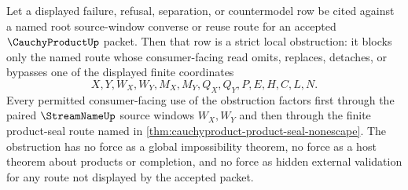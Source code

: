 \begin{corollary}
\label{cor:cauchyproduct-root-source-window-strict-obstruction}
Let a displayed failure, refusal, separation, or countermodel row be cited against a named root source-window converse or reuse route for an accepted $\CauchyProductUp$ packet. Then that row is a strict local obstruction: it blocks only the named route whose consumer-facing read omits, replaces, detaches, or bypasses one of the displayed finite coordinates
$$
X,Y,W_X,W_Y,M_X,M_Y,Q_X,Q_Y,P,E,H,C,L,N .
$$
Every permitted consumer-facing use of the obstruction factors first through the paired $\StreamNameUp$ source windows $W_X,W_Y$ and then through the finite product-seal route named in \autoref{thm:cauchyproduct-product-seal-nonescape}. The obstruction has no force as a global impossibility theorem, no force as a host theorem about products or completion, and no force as hidden external validation for any route not displayed by the accepted packet.
\end{corollary}
